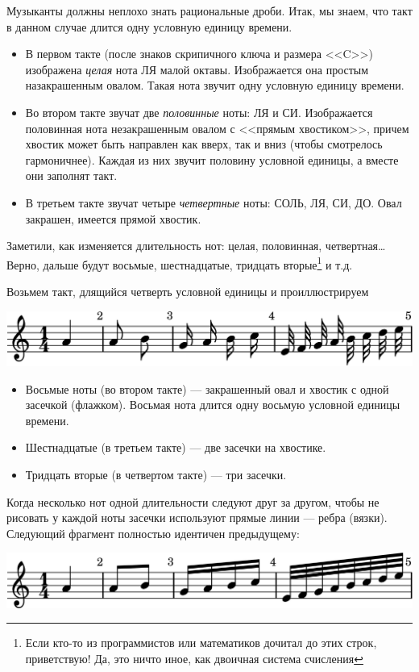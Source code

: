 Музыканты должны неплохо знать рациональные дроби. Итак, мы знаем, что такт в данном случае длится одну условную единицу времени.
\begin{itemize}
    \item В первом такте (после знаков скрипичного ключа и размера <<C>>) изображена \emph{целая} нота ЛЯ малой октавы. Изображается она простым назакрашенным овалом. Такая нота звучит одну условную единицу времени. 
    
    \item Во втором такте звучат две \emph{половинные} ноты: ЛЯ и СИ. Изображается половинная нота незакрашенным овалом с <<прямым хвостиком>>, причем хвостик может быть направлен как вверх, так и вниз (чтобы смотрелось гармоничнее). Каждая из них звучит половину условной единицы, а вместе они заполнят такт.
    
    \item В третьем такте звучат четыре \emph{четвертные} ноты: СОЛЬ, ЛЯ, СИ, ДО. Овал закрашен, имеется прямой хвостик.
\end{itemize}

Заметили, как изменяется длительность нот: целая, половинная, четвертная\ldots Верно, дальше будут восьмые, шестнадцатые, тридцать вторые\footnote{Если кто-то из программистов или математиков дочитал до этих строк, приветствую! Да, это ничто иное, как двоичная система счисления} и т.д.

Возьмем такт, длящийся четверть условной единицы и проиллюстрируем 
\begin{center}    
    \includegraphics{fig/notes/time-1-4-beam-off}
\end{center}

\begin{itemize}
    \item Восьмые ноты (во втором такте) --- закрашенный овал и хвостик с одной засечкой (флажком). Восьмая нота длится одну восьмую условной единицы времени.
    \item Шестнадцатые (в третьем такте) --- две засечки на хвостике.
    \item Тридцать вторые (в четвертом такте) --- три засечки.
\end{itemize}

Когда несколько нот одной длительности следуют друг за другом, чтобы не рисовать у каждой ноты засечки используют прямые линии --- ребра (вязки). Следующий фрагмент полностью идентичен предыдущему:
\begin{center}    
    \includegraphics{fig/notes/time-1-4-beam-on}
\end{center}

